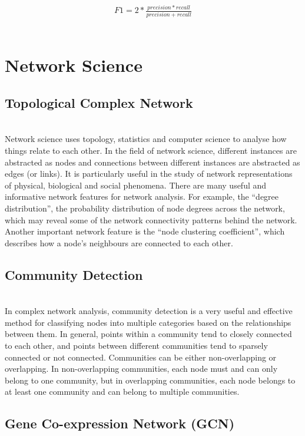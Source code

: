 \documentclass[12pt,a4paper]{report}
\begin{document}
\begin{gather*}
	    F1 = 2*\frac{precision  * recall}{ precision + recall}
\end{gather*}\\

\section{Network Science}

\subsection{Topological Complex Network}\\

Network science uses topology, statistics and computer science to analyse how things relate to each other. In the field of network science, different instances are abstracted as nodes and connections between different instances are abstracted as edges (or links). It is particularly useful in the study of network representations of physical, biological and social phenomena. 
There are many useful and informative network features for network analysis. For example, the ``degree distribution'', the probability distribution of node degrees across the network, which may reveal some of the network connectivity patterns behind the network. Another important network feature is the ``node clustering coefficient'', which describes how a node's neighbours are connected to each other.\\


\subsection{Community Detection}\\


In complex network analysis, community detection is a very useful and effective method for classifying nodes into multiple categories based on the relationships between them. In general, points within a community tend to closely connected to each other, and points between different communities tend to sparsely connected or not connected. Communities can be either non-overlapping or overlapping. In non-overlapping communities, each node must and can only belong to one community, but in overlapping communities, each node belongs to at least one community and can belong to multiple communities.\\

\subsection{Gene Co-expression Network (GCN)}\\
\end{document}
